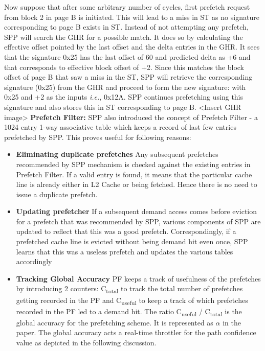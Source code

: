\documentclass{sig-alternate}
\begin{document}
Now suppose that after some arbitrary number of cycles, first prefetch request from block 2 in page B is initiated. This will lead to a miss in ST as no signature corresponding to page B exists in ST. Instead of not attempting any prefetch, SPP will search the GHR for a possible match. It does so by calculating the effective offset pointed by the last offset and the delta entries in the GHR. It sees that the signature 0x25 has the last offset of 60 and predicted delta as +6 and that corresponds to effective block offset of +2. Since this matches the block offset of page B that saw a miss in the ST, SPP will retrieve the corresponding signature (0x25) from the GHR and proceed to form the new signature: with 0x25 and +2 as the inputs \textit{i.e.}, 0x12A. SPP continues prefetching using this signature and also stores this in ST corresponding to page B. <Insert GHR image>
\newline
\newline
\textbf{Prefetch Filter:} SPP also introduced the concept of Prefetch Filter - a 1024 entry 1-way associative table which keeps a record of last few entries prefetched by SPP. This proves useful for following reasons:
\begin{itemize}
    \item \textbf{Eliminating duplicate prefetches}\newline 
    Any subsequent prefetches recommended by SPP mechanism is checked against the existing entries in Prefetch Filter. If a valid entry is found, it means that the particular cache line is already either in L2 Cache or being fetched. Hence there is no need to issue a duplicate prefetch.
    
    \item \textbf{Updating prefetcher}\newline
    If a subsequent demand access comes before eviction for a prefetch that was recommended by SPP, various components of SPP are updated to reflect that this was a good prefetch. Correspondingly, if a prefetched cache line is evicted without being demand hit even once, SPP learns that this was a useless prefetch and updates the various tables accordingly
    
    \item \textbf{Tracking Global Accuracy}\newline
    PF keeps a track of usefulness of the prefetches by introducing 2 counters: C\textsubscript{total} to track the total number of prefetches getting recorded in the PF and C\textsubscript{useful} to keep a track of which prefetches recorded in the PF led to a demand hit. The ratio C\textsubscript{useful} / C\textsubscript{total} is the global accuracy for the prefetching scheme. It is represented as $\alpha$ in the paper. The global accuracy acts a real-time throttler for the path confidence value as depicted in the following discussion.
\end{itemize}
\end{document}
